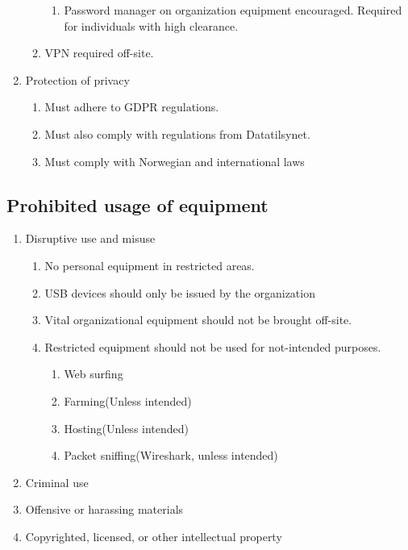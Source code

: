 \begin{enumerate}
\begin{enumerate}
\begin{enumerate}
      \item Password manager on organization equipment encouraged. Required for individuals with high clearance.
    \end{enumerate}
    \item VPN required off-site.
  \end{enumerate}
  \item Protection of privacy
  \begin{enumerate}
    \item Must adhere to GDPR regulations.
    \item Must also comply with regulations from Datatilsynet.
    \item Must comply with Norwegian and international laws
  \end{enumerate}
\end{enumerate}

\subsection{Prohibited usage of equipment}

\begin{enumerate}
  \item Disruptive use and misuse
  \begin{enumerate}
    \item No personal equipment in restricted areas.
    \item USB devices should only be issued by the organization
    \item Vital organizational equipment should not be brought off-site.
    \item Restricted equipment should not be used for not-intended purposes.
    \begin{enumerate}
      \item Web surfing
      \item Farming(Unless intended)
      \item Hosting(Unless intended)
      \item Packet sniffing(Wireshark, unless intended)
    \end{enumerate}
  \end{enumerate}
  \item Criminal use
  \item Offensive or harassing materials
  \item Copyrighted, licensed, or other intellectual property
\end{enumerate}


